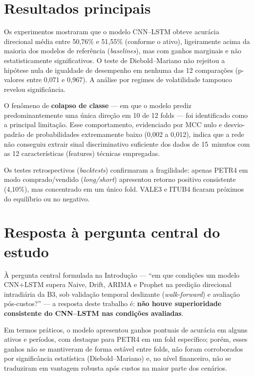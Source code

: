 \section*{Resultados principais}

Os experimentos mostraram que o modelo CNN--LSTM obteve acurácia direcional média entre
50,76\% e 51,55\% (conforme o ativo), ligeiramente acima da maioria dos modelos de referência (\textit{baselines}),
mas com ganhos marginais e não estatisticamente significativos. O teste de Diebold--Mariano
não rejeitou a hipótese nula de igualdade de desempenho em nenhuma das 12 comparações
(p-valores entre 0,071 e 0,967). A análise por regimes de volatilidade tampouco revelou
significância.

O fenômeno de \textbf{colapso de classe} --- em que o modelo prediz predominantemente uma
única direção em 10 de 12 folds --- foi identificado como a principal limitação.
Esse comportamento, evidenciado por MCC nulo e desvio-padrão de probabilidades extremamente
baixo (0,002 a 0,012), indica que a rede não conseguiu extrair sinal discriminativo
suficiente dos dados de 15~minutos com as 12 características (features) técnicas empregadas.

Os testes retrospectivos (\textit{backtests}) confirmaram a fragilidade: apenas PETR4 em modo comprado/vendido (\textit{long/short}) apresentou
retorno positivo consistente (4,10\%), mas concentrado em um único fold.
VALE3 e ITUB4 ficaram próximos do equilíbrio ou no negativo.

\section*{Resposta à pergunta central do estudo}

À pergunta central formulada na Introdução --- ``em que condições um modelo CNN+LSTM supera Naive, Drift, ARIMA e Prophet na predição direcional intradiária da B3, sob validação temporal deslizante (\textit{walk-forward}) e avaliação pós-custos?'' --- a resposta deste trabalho é: \textbf{não houve superioridade consistente do CNN--LSTM nas condições avaliadas}.

Em termos práticos, o modelo apresentou ganhos pontuais de acurácia em alguns ativos e períodos, com destaque para PETR4 em um fold específico; porém, esses ganhos não se mantiveram de forma estável entre folds, não foram corroborados por significância estatística (Diebold--Mariano) e, no nível financeiro, não se traduziram em vantagem robusta após custos na maior parte dos cenários.

